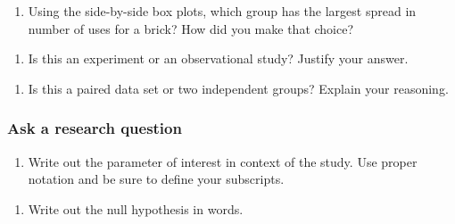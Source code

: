 \documentclass[
]{report}
\providecommand{\tightlist}{%
  \setlength{\itemsep}{0pt}\setlength{\parskip}{0pt}}
\begin{document}
\vspace{.4in}

\begin{enumerate}
\def\labelenumi{\arabic{enumi}.}
\setcounter{enumi}{2}
\tightlist
\item
  Using the side-by-side box plots, which group has the largest spread in number of uses for a brick? How did you make that choice?
\end{enumerate}

\vspace{.4in}

\newpage

\begin{enumerate}
\def\labelenumi{\arabic{enumi}.}
\setcounter{enumi}{3}
\tightlist
\item
  Is this an experiment or an observational study? Justify your answer.
\end{enumerate}

\vspace{1in}

\begin{enumerate}
\def\labelenumi{\arabic{enumi}.}
\setcounter{enumi}{4}
\tightlist
\item
  Is this a paired data set or two independent groups? Explain your reasoning.
\end{enumerate}

\vspace{1in}

\hypertarget{ask-a-research-question-3}{%
\subsubsection*{Ask a research question}\label{ask-a-research-question-3}}

\begin{enumerate}
\def\labelenumi{\arabic{enumi}.}
\setcounter{enumi}{5}
\tightlist
\item
  Write out the parameter of interest in context of the study. Use proper notation and be sure to define your subscripts.
\end{enumerate}

\vspace{1in}

\begin{enumerate}
\def\labelenumi{\arabic{enumi}.}
\setcounter{enumi}{6}
\tightlist
\item
  Write out the null hypothesis in words.
\end{enumerate}
\end{document}
